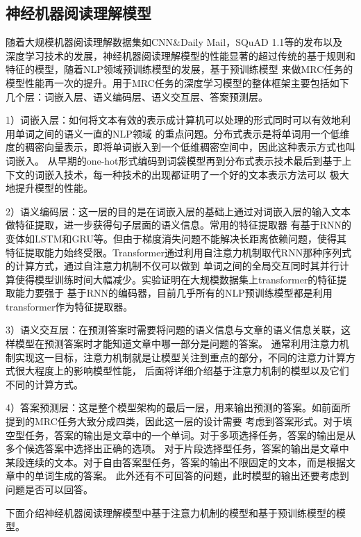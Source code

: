 \documentclass{article}
\newcommand{\upcite}[1]{\textsuperscript{\textsuperscript{\cite{#1}}}}
\begin{document}
\begin{multicols}{2}
%

%
\section{神经机器阅读理解模型}
随着大规模机器阅读理解数据集如CNN\&Daily Mail\upcite{Teaching Machines to Read and Comprehend}，SQuAD 1.1\upcite{SQuAD1}等的发布以及
深度学习技术的发展，神经机器阅读理解模型的性能显著的超过传统的基于规则和特征的模型，随着NLP领域预训练模型的发展，基于预训练模型
来做MRC任务的模型性能再一次的提升。用于MRC任务的深度学习模型的整体框架主要包括如下几个层：词嵌入层、语义编码层、语义交互层、答案预测层。

1）词嵌入层：如何将文本有效的表示成计算机可以处理的形式同时可以有效地利用单词之间的语义一直的NLP领域
的重点问题。分布式表示是将单词用一个低维度的稠密向量表示，即将单词嵌入到一个低维稠密空间中，因此这种表示方式也叫词嵌入。
从早期的one-hot形式编码到词袋模型再到分布式表示技术最后到基于上下文的词嵌入技术，每一种技术的出现都证明了一个好的文本表示方法可以
极大地提升模型的性能。

2）语义编码层：这一层的目的是在词嵌入层的基础上通过对词嵌入层的输入文本做特征提取，进一步获得句子层面的语义信息。常用的特征提取器
有基于RNN的变体如LSTM\upcite{lstm}和GRU\cite{s}等。但由于梯度消失问题不能解决长距离依赖问题，使得其
特征提取能力始终受限。Transformer\upcite{Transformer}通过利用自注意力机制取代RNN那种序列式的计算方式，通过自注意力机制不仅可以做到
单词之间的全局交互同时其并行计算使得模型训练时间大幅减少。实验证明在大规模数据集上transformer的特征提取能力要强于
基于RNN的编码器，目前几乎所有的NLP预训练模型都是利用transformer作为特征提取器。

3）语义交互层：在预测答案时需要将问题的语义信息与文章的语义信息关联，这样模型在预测答案时才能知道文章中哪一部分是问题的答案。
通常利用注意力机制实现这一目标，注意力机制就是让模型关注到重点的部分，不同的注意力计算方式很大程度上的影响模型性能，
后面将详细介绍基于注意力机制的模型以及它们不同的计算方式。

4）答案预测层：这是整个模型架构的最后一层，用来输出预测的答案。如前面所提到的MRC任务大致分成四类，因此这一层的设计需要
考虑到答案形式。对于填空型任务，答案的输出是文章中的一个单词。对于多项选择任务，答案的输出是从多个候选答案中选择出正确的选项。
对于片段选择型任务，答案的输出是文章中某段连续的文本。对于自由答案型任务，答案的输出不限固定的文本，而是根据文章中的单词生成的答案。
此外还有不可回答的问题，此时模型的输出还要考虑到问题是否可以回答。

下面介绍神经机器阅读理解模型中基于注意力机制的模型和基于预训练模型的模型。
%








%









\end{multicols}
\end{document}
